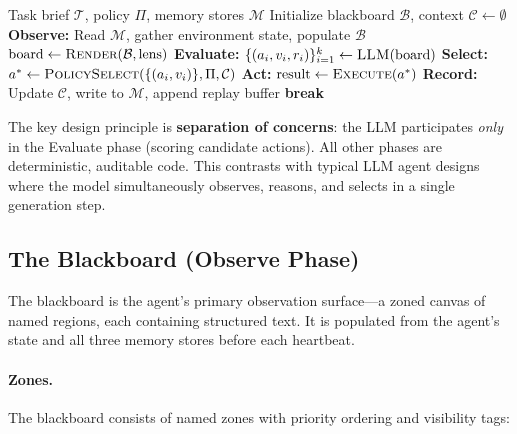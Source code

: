 \documentclass[letterpaper]{article}
\begin{document}
\begin{algorithm}[h]
\caption{Rho Heartbeat Loop}
\label{alg:heartbeat}
\begin{algorithmic}[1]
\REQUIRE Task brief $\mathcal{T}$, policy $\Pi$, memory stores $\mathcal{M}$
\STATE Initialize blackboard $\mathcal{B}$, context $\mathcal{C} \leftarrow \emptyset$
  \STATE \textbf{Observe:} Read $\mathcal{M}$, gather environment state, populate $\mathcal{B}$
  \STATE $\text{board} \leftarrow \textsc{Render}(\mathcal{B}, \text{lens})$
  \STATE \textbf{Evaluate:} $\{(a_i, v_i, r_i)\}_{i=1}^{k} \leftarrow \textsc{LLM}(\text{board})$
  \STATE \textbf{Select:} $a^* \leftarrow \textsc{PolicySelect}(\{(a_i, v_i)\}, \Pi, \mathcal{C})$
  \STATE \textbf{Act:} $\text{result} \leftarrow \textsc{Execute}(a^*)$
  \STATE \textbf{Record:} Update $\mathcal{C}$, write to $\mathcal{M}$, append replay buffer
    \STATE \textbf{break}
  \ENDIF
\ENDFOR
\end{algorithmic}
\end{algorithm}

The key design principle is \textbf{separation of concerns}: the LLM participates \emph{only} in the Evaluate phase (scoring candidate actions). All other phases are deterministic, auditable code. This contrasts with typical LLM agent designs where the model simultaneously observes, reasons, and selects in a single generation step.

\subsection{The Blackboard (Observe Phase)}
\label{sec:blackboard}

The blackboard is the agent's primary observation surface---a zoned canvas of named regions, each containing structured text. It is populated from the agent's state and all three memory stores before each heartbeat.

\paragraph{Zones.} The blackboard consists of named zones with priority ordering and visibility tags:
\end{document}
